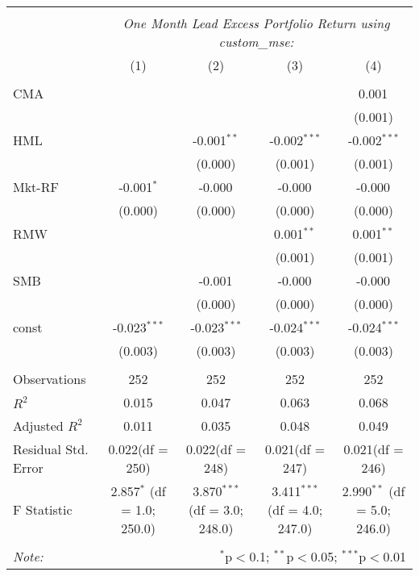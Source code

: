 \begin{table}[!htbp] \centering
\begin{tabular}{@{\extracolsep{5pt}}lcccc}
\\[-1.8ex]\hline
\hline \\[-1.8ex]
& \multicolumn{4}{c}{\textit{One Month Lead Excess Portfolio Return using custom_mse:}} \
\cr \cline{4-5}
\\[-1.8ex] & (1) & (2) & (3) & (4) \\
\hline \\[-1.8ex]
 CMA & & & & 0.001$^{}$ \\
  & & & & (0.001) \\
 HML & & -0.001$^{**}$ & -0.002$^{***}$ & -0.002$^{***}$ \\
  & & (0.000) & (0.001) & (0.001) \\
 Mkt-RF & -0.001$^{*}$ & -0.000$^{}$ & -0.000$^{}$ & -0.000$^{}$ \\
  & (0.000) & (0.000) & (0.000) & (0.000) \\
 RMW & & & 0.001$^{**}$ & 0.001$^{**}$ \\
  & & & (0.001) & (0.001) \\
 SMB & & -0.001$^{}$ & -0.000$^{}$ & -0.000$^{}$ \\
  & & (0.000) & (0.000) & (0.000) \\
 const & -0.023$^{***}$ & -0.023$^{***}$ & -0.024$^{***}$ & -0.024$^{***}$ \\
  & (0.003) & (0.003) & (0.003) & (0.003) \\
\hline \\[-1.8ex]
 Observations & 252 & 252 & 252 & 252 \\
 $R^2$ & 0.015 & 0.047 & 0.063 & 0.068 \\
 Adjusted $R^2$ & 0.011 & 0.035 & 0.048 & 0.049 \\
 Residual Std. Error & 0.022(df = 250) & 0.022(df = 248) & 0.021(df = 247) & 0.021(df = 246)  \\
 F Statistic & 2.857$^{*}$ (df = 1.0; 250.0) & 3.870$^{***}$ (df = 3.0; 248.0) & 3.411$^{***}$ (df = 4.0; 247.0) & 2.990$^{**}$ (df = 5.0; 246.0) \\
\hline
\hline \\[-1.8ex]
\textit{Note:} & \multicolumn{4}{r}{$^{*}$p$<$0.1; $^{**}$p$<$0.05; $^{***}$p$<$0.01} \\
\end{tabular}
\end{table}
